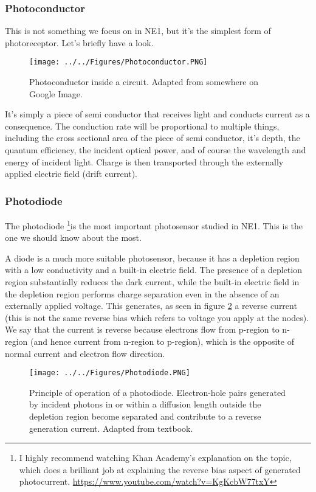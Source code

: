 \subsubsection{Photoconductor}

This is not something we focus on in NE1, but it's the simplest form of photoreceptor. Let's briefly have a look. 

\begin{figure}[H]
    \centering
    \texttt{[image: ../../Figures/Photoconductor.PNG]}
    \caption{Photoconductor inside a circuit. Adapted from somewhere on Google Image.}
    \label{fig:Photoconductor}
\end{figure}

It's simply a piece of semi conductor that receives light and conducts current as a consequence. The conduction rate will be proportional to multiple things, including the cross sectional area of the piece of semi conductor, it's depth, the quantum efficiency, the incident optical power, and of course the wavelength and energy of incident light. Charge is then transported through the externally applied electric field (drift current). 

\subsubsection{Photodiode}

The photodiode \footnote{I highly recommend watching Khan Academy's explanation on the topic, which does a brilliant job at explaining the reverse bias aspect of generated photocurrent. \url{https://www.youtube.com/watch?v=KgKcbW77txY}}is the most important photosensor studied in NE1. This is the one we should know about the most. 

A diode is a much more suitable photosensor, because it has a depletion region with a low conductivity and a built-in electric field. The presence of a depletion region substantially reduces the dark current, while the built-in electric field in the depletion region performs charge separation even in the absence of an externally applied voltage. This generates, as seen in figure \ref{fig:Photodiode} a reverse current (this is not the same reverse bias which refers to voltage you apply at the nodes). We say that the current is reverse because electrons flow from p-region to n-region (and hence current from n-region to p-region), which is the opposite of normal current and electron flow direction. 

\begin{figure}[H]
    \centering
    \texttt{[image: ../../Figures/Photodiode.PNG]}
    \caption{Principle of operation of a photodiode. Electron-hole pairs generated by incident photons in or within a diffusion length outside the depletion region become separated and contribute to a reverse generation current. Adapted from textbook.}
    \label{fig:Photodiode}
\end{figure}


